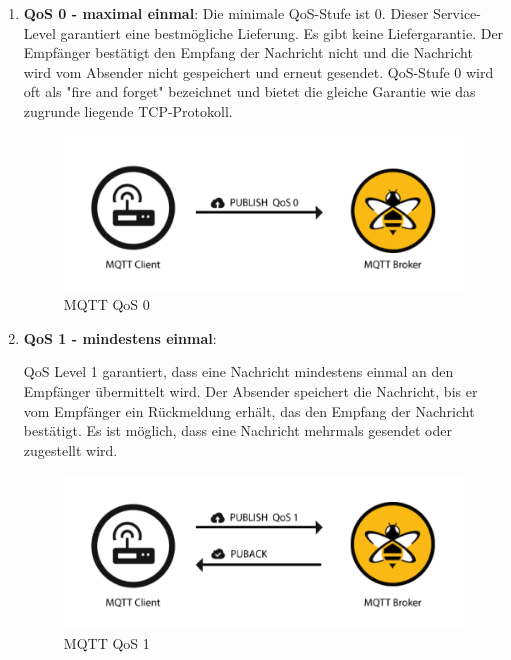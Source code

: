 \begin{enumerate}
    \item \textbf{QoS 0 - maximal einmal}:
    Die minimale QoS-Stufe ist 0. Dieser Service-Level garantiert eine bestmögliche Lieferung. Es gibt keine Liefergarantie. Der Empfänger bestätigt den Empfang der Nachricht nicht und die Nachricht wird vom Absender nicht gespeichert und erneut gesendet. QoS-Stufe 0 wird oft als "fire and forget" bezeichnet und bietet die gleiche Garantie wie das zugrunde liegende TCP-Protokoll. \cite{hivemq}

    \begin{figure}[H]
        \begin{center}
            \includegraphics[scale=0.8]{images/QoS-0.png}
            \caption{MQTT QoS 0 \cite{hivemq}}
        \end{center}
    \end{figure}

    \item \textbf{QoS 1 - mindestens einmal}:
    
    QoS Level 1 garantiert, dass eine Nachricht mindestens einmal an den Empfänger übermittelt wird. Der Absender speichert die Nachricht, bis er vom Empfänger ein Rückmeldung erhält, das den Empfang der Nachricht bestätigt. Es ist möglich, dass eine Nachricht mehrmals gesendet oder zugestellt wird. \cite{hivemq}

    \begin{figure}[H]
        \begin{center}
            \includegraphics[scale=0.8]{images/QoS-1.png}
            \caption{MQTT QoS 1 \cite{hivemq}}
        \end{center}
    \end{figure}


\end{enumerate}

